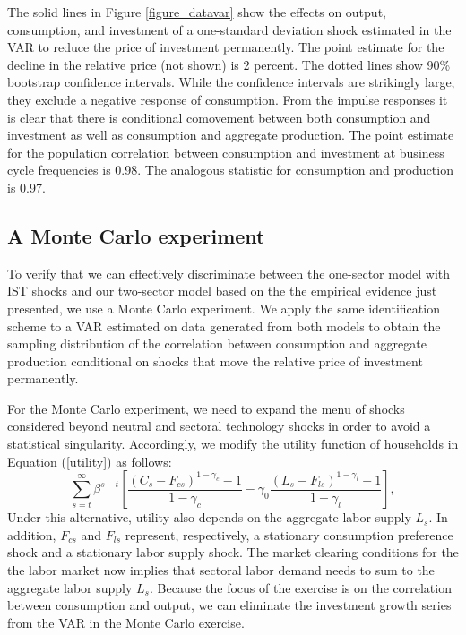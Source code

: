 \documentclass[12pt,fleqn]{article}
\begin{document}
{\normalsize The solid lines in Figure \ref{figure_datavar} show the effects
on output, consumption, and investment of a one-standard deviation shock
estimated in the VAR to reduce the price of investment permanently. The
point estimate for the decline in the relative price (not shown) is 2
percent. The dotted lines show 90\% bootstrap confidence intervals. While
the confidence intervals are strikingly large, they exclude a negative
response of consumption. From the impulse responses it is clear that there
is conditional comovement between both consumption and investment as well as
consumption and aggregate production. The point estimate for the population
correlation between consumption and investment at business cycle frequencies
is 0.98. The analogous statistic for consumption and production is 0.97.%
 }

\subsection{\protect\normalsize A Monte Carlo experiment}

{\normalsize To verify that we can effectively discriminate between the
one-sector model with IST shocks and our two-sector model based on the the
empirical evidence just presented, we use a Monte Carlo experiment. We apply
the same identification scheme to a VAR estimated on data generated from
both models to obtain the sampling distribution of the correlation between
consumption and aggregate production conditional on shocks that move the
relative price of investment permanently. }

{\normalsize For the Monte Carlo experiment, we need to expand the menu of
shocks considered beyond neutral and sectoral technology shocks in order to
avoid a statistical singularity. Accordingly, we modify the utility function
of households in Equation (\ref{utility}) as follows:
\begin{equation}
\sum_{s=t}^{\infty }\beta ^{s-t} \left[ \frac{\left( C_{s} -F_{cs}\right)
^{1-\gamma_c }-1}{1-\gamma_c } - \gamma_{0} \frac{\left( L_{s}
-F_{ls}\right) ^{1-\gamma_l }-1}{1-\gamma_l } \right],  \label{utility2}
\end{equation}
Under this alternative, utility also depends on the aggregate labor supply $%
L_s$. In addition, $F_{cs}$ and $F_{ls}$ represent, respectively, a
stationary consumption preference shock and a stationary labor supply shock.
The market clearing conditions for the the labor market now implies that
sectoral labor demand needs to sum to the aggregate labor supply $L_s$.
Because the focus of the exercise is on the correlation between consumption
and output, we can eliminate the investment growth series from the VAR in
the Monte Carlo exercise. }
\end{document}
